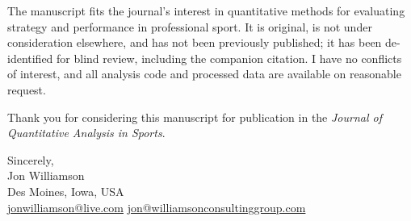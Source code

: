 \documentclass[12pt,USenglish]{article}
\begin{document}
The manuscript fits the journal's interest in quantitative methods for evaluating strategy and performance in professional sport. It is original, is not under consideration elsewhere, and has not been previously published; it has been de-identified for blind review, including the companion citation. I have no conflicts of interest, and all analysis code and processed data are available on reasonable request.

Thank you for considering this manuscript for publication in the \emph{Journal of Quantitative Analysis in Sports}.

\medskip

Sincerely,\\
Jon Williamson\\
Des Moines, Iowa, USA\\
\href{mailto:jonwilliamson@live.com}{jonwilliamson@live.com} \quad \href{mailto:jon@williamsonconsultinggroup.com}{jon@williamsonconsultinggroup.com}
\end{document}
